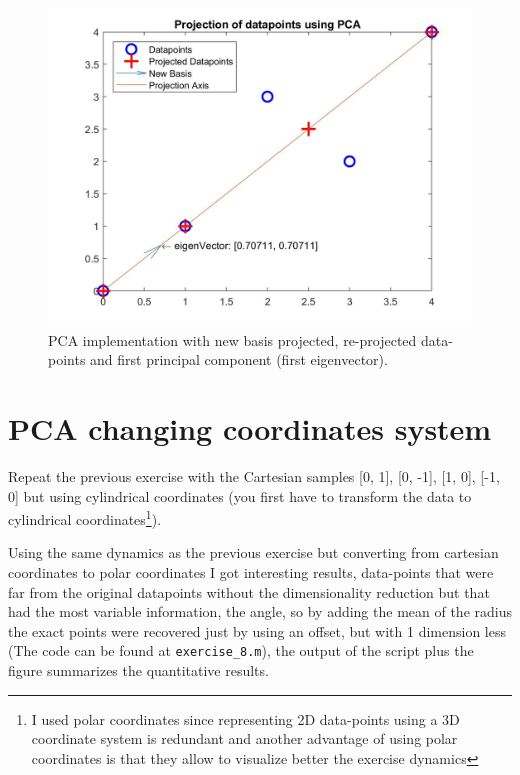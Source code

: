 \documentclass[]{article}
\begin{document}
\begin{figure}[ht!]
	\centering
	\includegraphics[width=\textwidth]{../img/pca-fig-1}
	\caption{PCA implementation with new basis projected, re-projected data-points and first principal component (first eigenvector).}
\end{figure}

\pagebreak

\section{PCA changing coordinates system}

Repeat the previous exercise with the Cartesian samples [0, 1], [0, -1], [1, 0], [-1, 0] but using cylindrical coordinates (you first have to transform the data to cylindrical coordinates\footnote{I used polar coordinates since representing 2D data-points using a 3D coordinate system is redundant and another advantage of using polar coordinates is that they allow to visualize better the exercise dynamics}). 

Using the same dynamics as the previous exercise but converting from cartesian coordinates to polar coordinates I got interesting results, data-points that were far from the original datapoints without the dimensionality reduction but that had the most variable information, the angle, so by adding the mean of the radius the exact points were recovered just by using an offset, but with 1 dimension less (The code can be found at \texttt{exercise\_8.m}), the output of the script plus the figure summarizes the quantitative results.
\end{document}
